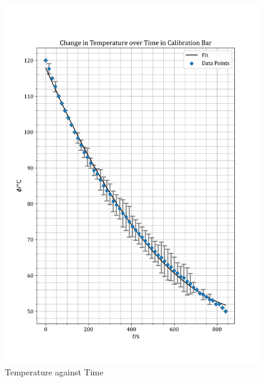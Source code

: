 \documentclass[12pt, a4paper]{article}
\begin{document}
\begin{figure}
    \centering
    \includegraphics[width=\textwidth]{PhivsT.png}
    \caption{Temperature against Time}
    \label{fig:Temperature vs t}
\end{figure}
\end{document}
